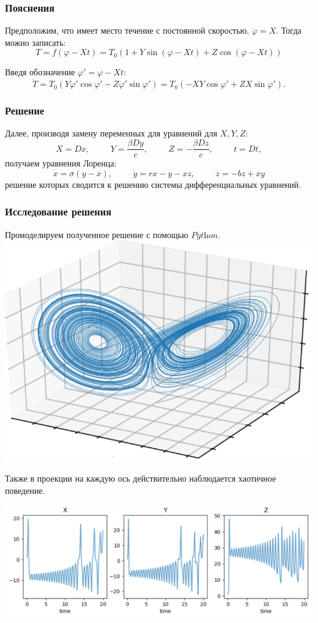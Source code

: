 \begin{frame}
	\frametitle{Пояснения}

	Предположим, что имеет место течение с постоянной скоростью, $\dot{\varphi} = X$. Тогда можно записать:		$$T = f(\varphi - X t) = T_0(1 + Y \sin (\varphi - X t) + Z \cos(\varphi - X t))$$

	Введя обозначение $\varphi' = \varphi - X t$:
	$$\dot{T} = T_0(Y \dot{\varphi}' \cos \varphi' - Z \dot{\varphi}' \sin{\varphi'}) = T_0(- X Y \cos \varphi' + Z X \sin \varphi').$$
\end{frame}

\begin{frame}
	\frametitle{Решение}

	Далее, производя замену переменных для уравнений для $X, Y, Z$:
	$$X = D x, \hspace{1cm} Y = \frac{\beta D y}{c}, \hspace{1cm} Z = -\frac{\beta D z}{c}, \hspace{1cm} t = D t,$$
	получаем уравнения Лоренца:
	$$\dot{x} = \sigma(y-x), \hspace{1cm} \dot{y} = r x - y -x z, \hspace{1cm} \dot{z} = -b z + x y$$
	решение которых сводится к решению системы дифференциальных уравнений.
\end{frame}

\begin{frame}
	\frametitle{Исследование решения}

	Промоделируем полученное решение с помощью $\textit{Python}$.
	\centering
	\includegraphics[height = 0.45\linewidth]{img/attr_L.png}
\end{frame}	

\begin{frame}
	Также в проекции на каждую ось действительно наблюдается хаотичное поведение.

	\centering
	\includegraphics[width = 0.95\linewidth]{img/xyz.png}
\end{frame}

